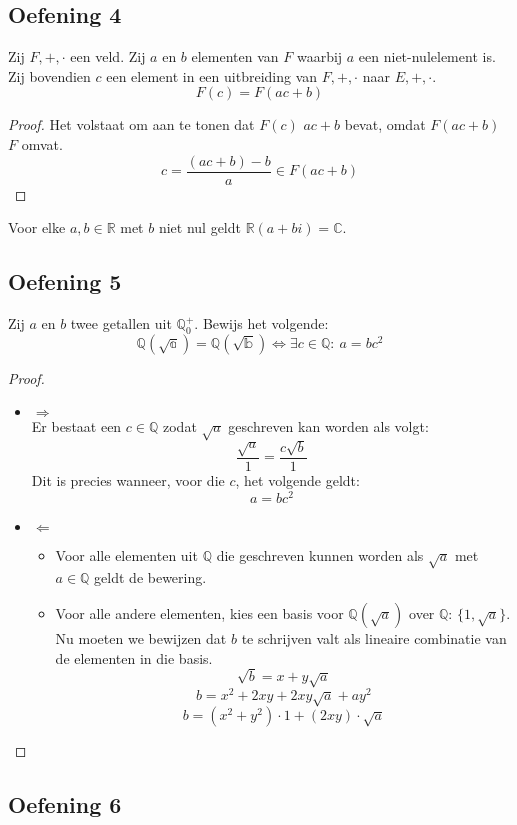 \documentclass[main.tex]{subfiles}
\begin{document}
\subsection*{Oefening 4}
Zij $F,+,\cdot$ een veld.
Zij $a$ en $b$ elementen van $F$ waarbij $a$ een niet-nulelement is.
Zij bovendien $c$ een element in een uitbreiding van $F,+,\cdot$ naar $E,+,\cdot$.
\[ F(c) = F(ac+b) \]

\begin{proof}
  Het volstaat om aan te tonen dat $F(c)$ $ac+b$ bevat, omdat $F(ac+b)$ $F$ omvat.
  \[ c  = \frac{(ac+b)-b}{a} \in F(ac+b) \]
\end{proof}

\begin{gev}
  Voor elke $a,b \in \mathbb{R}$ met $b$ niet nul geldt $\mathbb{R}(a+bi) = \mathbb{C}$.
\end{gev}

\subsection*{Oefening 5}
Zij $a$ en $b$ twee getallen uit $\mathbb{Q}^{+}_{0}$.
Bewijs het volgende:
\[ \mathbb{Q(\sqrt{a})} = \mathbb{Q(\sqrt{b})} \Leftrightarrow \exists c\in \mathbb{Q}:\ a = bc^{2} \]

\begin{proof}
  \begin{itemize}
  \item $\Rightarrow$\\
    Er bestaat een $c\in \mathbb{Q}$ zodat $\sqrt{a}$ geschreven kan worden als volgt:
    \[ \frac{\sqrt{a}}{1} = \frac{c\sqrt{b}}{1} \]
    Dit is precies wanneer, voor die $c$, het volgende geldt:
    \[ a = bc^{2}\]
  \item $\Leftarrow$\\
    \begin{itemize}
    \item Voor alle elementen uit $\mathbb{Q}$ die geschreven kunnen worden als $\sqrt{a}$ met $a \in \mathbb{Q}$ geldt de bewering.
    \item Voor alle andere elementen, kies een basis voor $\mathbb{Q}(\sqrt{a})$ over $\mathbb{Q}$: $\{1,\sqrt{a}\}$.
      Nu moeten we bewijzen dat $b$ te schrijven valt als lineaire combinatie van de elementen in die basis. 
      \[ \sqrt{b} = x + y\sqrt{a} \]
      \[ b = x^{2} + 2xy+2xy\sqrt{a} +ay^{2}\]
      \[ b = (x^{2}+y^{2})\cdot 1 + (2xy) \cdot \sqrt{a} \]
    \end{itemize}
  \end{itemize}      
\end{proof}

\subsection*{Oefening 6}
\end{document}
